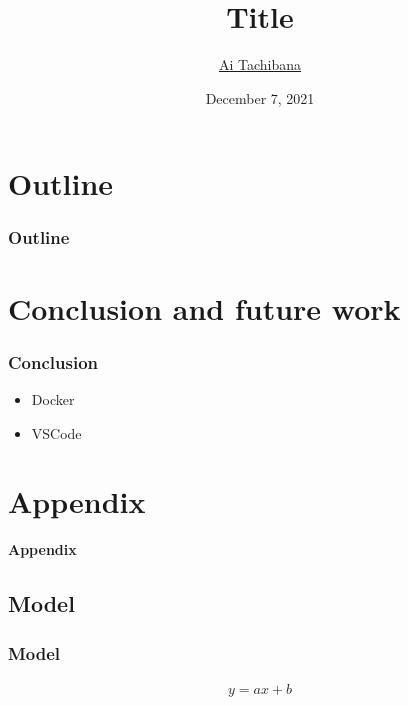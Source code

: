 \documentclass[aspectratio=169, unicode, 14pt]{beamer}
\title[short title]{Title}
\author{\underline{Ai Tachibana}} %
\institute[]
{
Graduate School of Engineering Science, Osaka University
}
\date{December 7, 2021} %
\begin{document}
\begin{frame}
\frametitle{}
\titlepage
\end{frame}


\section*{Outline}
\begin{frame}[t]\frametitle{Outline}
\tableofcontents
\end{frame}

\section{Conclusion and future work}
\begin{frame}[t]\frametitle{Conclusion}
  \begin{itemize}
    \item Docker
    \item VSCode
  \end{itemize}
\end{frame}

\backupbegin

\section*{Appendix}
\begin{frame}
  \textbf{\LARGE{Appendix}}
\end{frame}

\subsection*{Model}
\begin{frame}[t]\frametitle{Model}
  \begin{align}
  y = ax + b \nonumber
  \end{align}
\end{frame}


\backupend
\end{document}
